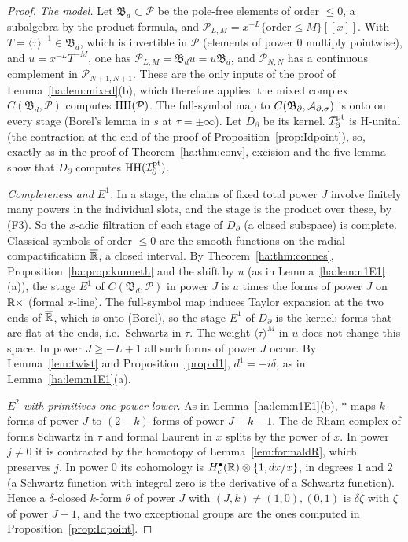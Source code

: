 \begin{proof}
\emph{The model.} Let \(\mathfrak B_d\subset\mathcal P\) be the
pole-free elements of order \(\le0\), a subalgebra by the product formula,
and \(\mathcal P_{L,M}=x^{-L}\{\text{order}\le M\}[[x]]\). With
\(T=\langle\tau\rangle^{-1}\in\mathfrak B_d\), which is invertible in
\(\mathcal P\) (elements of power \(0\) multiply pointwise), and
\(u=x^{-L}T^{-M}\), one has \(\mathcal P_{L,M}=\mathfrak B_du=u\mathfrak
B_d\), and \(\mathcal P_{N,N}\) has a continuous complement in
\(\mathcal P_{N+1,N+1}\). These are the only inputs of the proof of
Lemma~\ref{ha:lem:mixed}(b), which therefore applies: the mixed complex
\(C(\mathfrak B_d,\mathcal P)\) computes \(\operatorname{HH}(\mathcal P)\).
The full-symbol map to \(C(\mathfrak B_\partial,\mathcal A_{\partial,\sigma})\) is onto on every
stage (Borel's lemma in \(s\) at \(\tau=\pm\infty\)). Let \(D_\partial\) be
its kernel. \(\mathcal I_\partial^{\mathrm{pt}}\) is H-unital (the contraction at the end
of the proof of Proposition~\ref{prop:Idpoint}), so, exactly as in the
proof of Theorem~\ref{ha:thm:conv}, excision and the five lemma show that
\(D_\partial\) computes \(\operatorname{HH}(\mathcal I_\partial^{\mathrm{pt}})\).

\emph{Completeness and \(E^1\).} In a stage, the chains of fixed total
power \(J\) involve finitely many powers in the individual slots, and the
stage is the product over these, by (F3). So the \(x\)-adic filtration of
each stage of \(D_\partial\) (a closed subspace) is complete. Classical
symbols of order \(\le0\) are the smooth functions on the radial
compactification \(\overline{\mathbb R}\), a closed interval. By
Theorem~\ref{ha:thm:connes}, Proposition~\ref{ha:prop:kunneth} and the
shift by \(u\) (as in Lemma~\ref{ha:lem:n1E1}(a)), the stage \(E^1\) of
\(C(\mathfrak B_d,\mathcal P)\) in power \(J\) is \(u\) times the
forms of power \(J\) on \(\overline{\mathbb R}\times\) (formal \(x\)-line). The
full-symbol map induces Taylor expansion at the two ends of
\(\overline{\mathbb R}\), which is onto (Borel), so the stage \(E^1\) of
\(D_\partial\) is the kernel: forms that are flat at the ends, i.e.\
Schwartz in \(\tau\). The weight \(\langle\tau\rangle^M\) in \(u\) does
not change this space. In power \(J\ge-L+1\) all such forms of power
\(J\) occur. By Lemma~\ref{lem:twist} and Proposition~\ref{prop:d1},
\(d^1=-i\delta\), as in Lemma~\ref{ha:lem:n1E1}(a).

\emph{\(E^2\) with primitives one power lower.} As in
Lemma~\ref{ha:lem:n1E1}(b), \(*\) maps \(k\)-forms of power \(J\) to
\((2-k)\)-forms of power \(J+k-1\). The de Rham complex of forms Schwartz
in \(\tau\) and formal Laurent in \(x\) splits by the power of \(x\). In
power \(j\ne0\) it is contracted by the homotopy of
Lemma~\ref{lem:formaldR}, which preserves \(j\). In power \(0\) its
cohomology is \(H^\bullet_c(\mathbb R)\otimes\{1,dx/x\}\), in degrees \(1\) and
\(2\) (a Schwartz function with integral zero is the derivative of a
Schwartz function). Hence a \(\delta\)-closed \(k\)-form \(\theta\) of
power \(J\) with \((J,k)\ne(1,0),(0,1)\) is \(\delta\zeta\) with \(\zeta\)
of power \(J-1\), and the two exceptional groups are the ones computed in
Proposition~\ref{prop:Idpoint}.


\end{proof}

